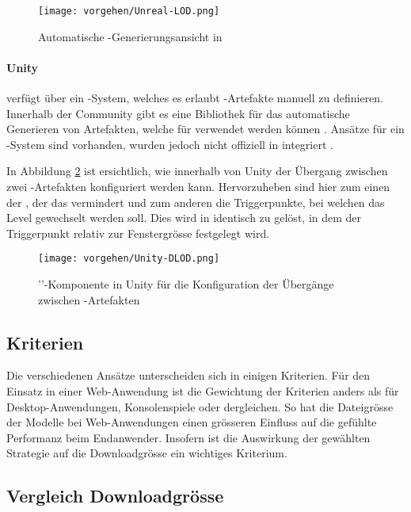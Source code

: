 \begin{figure}[H]
  \centering
  \texttt{[image: vorgehen/Unreal-LOD.png]}
  \caption{Automatische -Generierungsansicht in  \cite{unrealAutoLod}}
  \label{fig:unrealLODGeneration}
\end{figure}

\paragraph{Unity}

 verfügt über ein -System, welches es erlaubt -Artefakte manuell zu definieren.
Innerhalb der  Community gibt es eine Bibliothek für das automatische Generieren von Artefakten, welche für  verwendet werden können \cite{unityMeshSimplification}.
Ansätze für ein -System sind vorhanden, wurden jedoch nicht offiziell in  integriert \cite{unityAutoLod}.

In Abbildung \ref{fig:unityDLODGroup} ist ersichtlich, wie innerhalb von Unity der Übergang zwischen zwei -Artefakten konfiguriert werden kann. Hervorzuheben sind hier zum einen der , der das  vermindert und zum anderen die Triggerpunkte, bei welchen das Level gewechselt werden soll.
Dies wird in  identisch zu  gelöst, in dem der Triggerpunkt relativ zur Fenstergrösse festgelegt wird.

\begin{figure}[H]
  \centering
  \texttt{[image: vorgehen/Unity-DLOD.png]}
  \caption{''-Komponente in Unity für die Konfiguration der Übergänge zwischen -Artefakten}
  \label{fig:unityDLODGroup}
\end{figure}

\subsection{Kriterien}

Die verschiedenen Ansätze unterscheiden sich in einigen Kriterien. Für den Einsatz in einer Web-Anwendung ist die Gewichtung der Kriterien anders als für Desktop-Anwendungen, Konsolenspiele oder dergleichen.
So hat die Dateigrösse der Modelle bei Web-Anwendungen einen grösseren Einfluss auf die gefühlte Performanz beim Endanwender. Insofern ist die Auswirkung der gewählten Strategie auf die Downloadgrösse ein wichtiges Kriterium.

\subsection{Vergleich Downloadgrösse}

